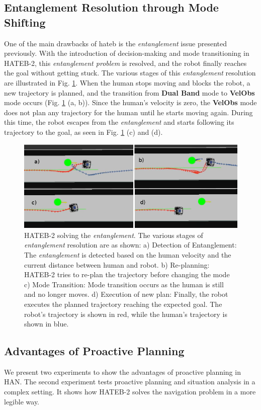 \subsection{Entanglement Resolution through Mode Shifting}
One of the main drawbacks of \acrshort{hateb} is the \textit{entanglement} issue presented previously. With the introduction of decision-making and mode transitioning in HATEB-2, this \textit{entanglement problem} is resolved, and the robot finally reaches the goal without getting stuck.  The various stages of this \textit{entanglement} resolution are illustrated in Fig. \ref{resolve}.  When the human stops moving and blocks the robot, a new trajectory is planned, and the transition from \textbf{Dual Band} mode to \textbf{VelObs} mode occurs (Fig. \ref{resolve} (a, b)). Since the human's velocity is zero, the \textbf{VelObs} mode does not plan any trajectory for the human until he starts moving again. During this time, the robot escapes from the \textit{entanglement} and starts following its trajectory to the goal, as seen in Fig. \ref{resolve} (c) and (d).   
\begin{figure}[!h]
\centering
\includegraphics[width=0.9\columnwidth]{images/chapter3/mode_change.png}
\caption{HATEB-2 solving the \textit{entanglement}. The various stages of \textit{entanglement} resolution are as shown: a) Detection of Entanglement: The \textit{entanglement} is detected based on the human velocity and the current distance between human and robot. b) Re-planning: HATEB-2 tries to re-plan the trajectory before changing the mode c) Mode Transition: Mode transition occurs as the human is still and no longer moves. d) Execution of new plan: Finally, the robot executes the planned trajectory reaching the expected goal. The robot's trajectory is shown in red, while the human's trajectory is shown in blue.}
\label{resolve}
\end{figure}

\subsection{Advantages of Proactive Planning}
We present two experiments to show the advantages of proactive planning in HAN. The second experiment tests proactive planning and situation analysis in a complex setting. It shows how HATEB-2 solves the navigation problem in a more legible way.

